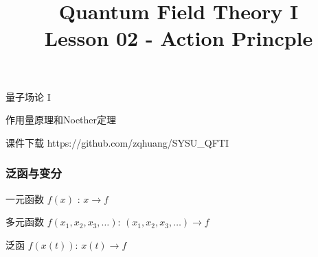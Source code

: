 \documentclass[CJK]{beamer}
\title{Quantum Field Theory I \\ Lesson 02 - Action Princple}
\author{}
\date{}
\begin{document}
\begin{frame}
 
\begin{center}
\begin{Large}
\bch
量子场论 I 

{\vskip 0.3in}

作用量原理和Noether定理

\ech
\end{Large}
\end{center}

\vskip 0.2in

\bch
课件下载
\ech
https://github.com/zqhuang/SYSU\_QFTI

\end{frame}


\begin{frame}
\frametitle{\bch 泛函与变分 \ech}
\bch
一元函数 $f(x)$ :  $x \rightarrow f$

多元函数 $f(x_1, x_2, x_3, \ldots)$: $(x_1, x_2, x_3,\ldots) \rightarrow f$

泛函 $f\left(x(t)\right)$: $x(t) \rightarrow f$
\ech
\end{frame}
\end{document}
